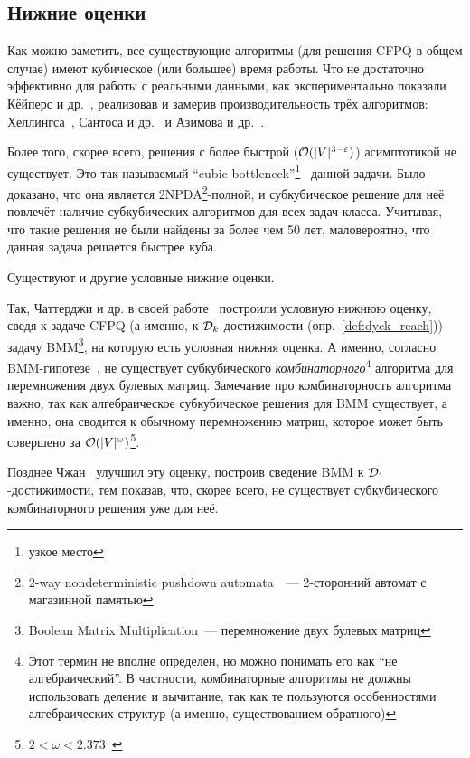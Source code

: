 \subsection{Нижние оценки}

Как можно заметить, все существующие алгоритмы (для решения CFPQ в общем случае) имеют кубическое (или большее) время работы. Что не достаточно эффективно для работы с реальными данными, как экспериментально показали Кёйперс и др.~\cite{Kuijpers19}, реализовав и замерив производительность трёх алгоритмов: Хеллингса~\cite{Hellings15}, Сантоса и др.~\cite{Santos18} и Азимова и др.~\cite{Santos18}.

Более того, скорее всего, решения с более быстрой ($\mathcal{O}(|V|^{3 - \varepsilon})$) асимптотикой не существует. Это так называемый ``cubic bottleneck''\footnote{узкое место}~\cite{Heintze1997} данной задачи. Было доказано, что она является 2NPDA\footnote{2-way nondeterministic pushdown automata~\cite{Aho1968}~--- 2-сторонний автомат с магазинной памятью}-полной, и субкубическое решение для неё повлечёт наличие субкубических алгоритмов для всех задач класса. Учитывая, что такие решения не были найдены за более чем 50 лет, маловероятно, что данная задача решается быстрее куба. 

Существуют и другие условные нижние оценки. 

Так, Чаттерджи и др. в своей работе~\cite{Chatterjee17} построили условную нижнюю оценку, сведя к задаче CFPQ (а именно, к $\mathcal{D}_k$-достижимости (опр.~\ref{def:dyck_reach})) задачу BMM\footnote{Boolean Matrix Multiplication~--- перемножение двух булевых матриц}, на которую есть условная нижняя оценка. А именно, согласно BMM-гипотезе~\cite{Williams18}, не существует субкубического \textit{комбинаторного}\footnote{Этот термин не вполне определен, но можно понимать его как ``не алгебраический''. В частности, комбинаторные алгоритмы не должны использовать деление и вычитание, так как те пользуются особенностями алгебраических структур (а именно, существованием обратного)} алгоритма для перемножения двух булевых матриц. Замечание про комбинаторность алгоритма важно, так как алгебраическое субкубическое решения для BMM существует, а именно, она сводится к обычному перемножению матриц, которое может быть совершено за $\mathcal{O}(|V|^{\omega})$\footnote{$2 < \omega < 2.373$~\cite{Alman20}}.

Позднее Чжан~\cite{Zhang20} улучшил эту оценку, построив сведение BMM к $\mathcal{D}_1$-достижимости, тем показав, что, скорее всего, не существует субкубического комбинаторного решения уже для неё. 

